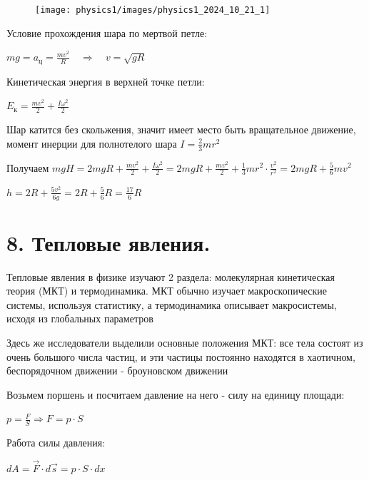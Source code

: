 \documentclass[12pt]{article}
\begin{document}
    \smallvspace

    \begin{minipage}{\textwidth}
        \begin{figure}
            \texttt{[image: physics1/images/physics1\_2024\_10\_21\_1]}
        \end{figure}
        
        Условие прохождения шара по мертвой петле: 
        
        $mg = a_{\text{ц}} = \frac{mv^2}{R} \quad \Longrightarrow \quad v = \sqrt{gR}$

        Кинетическая энергия в верхней точке петли: 
        
        $E_\text{к} = \frac{mv^2}{2} + \frac{I\omega^2}{2}$

        Шар катится без скольжения, значит имеет место быть вращательное движение, момент инерции для полнотелого шара $I = \frac{2}{3}mr^2$

        Получаем $mgH = 2mgR + \frac{mv^2}{2} + \frac{I\omega^2}{2} = 2mgR + \frac{mv^2}{2} + \frac{1}{3}mr^2 \cdot \frac{v^2}{r^2} = 
        2mgR + \frac{5}{6}mv^2$

        $h = 2R + \frac{5v^2}{6g} = 2R + \frac{5}{6}R = \frac{17}{6}R$
    \end{minipage}


    \section{8. Тепловые явления.}

    Тепловые явления в физике изучают 2 раздела: молекулярная кинетическая теория (МКТ) и термодинамика. 
    МКТ обычно изучает макроскопические системы, используя статистику, а термодинамика описывает
    макросистемы, исходя из глобальных параметров

    Здесь же исследователи выделили основные положения МКТ: все тела состоят из очень большого числа частиц, 
    и эти частицы постоянно находятся в хаотичном, беспорядочном движении - броуновском движении

    Возьмем поршень и посчитаем давление на него - силу на единицу площади:

    $p = \frac{F}{S} \Longrightarrow F = p \cdot S$

    Работа силы давления:

    $dA = \vec{F} \cdot d\vec{s} = p \cdot S \cdot dx$
\end{document}
